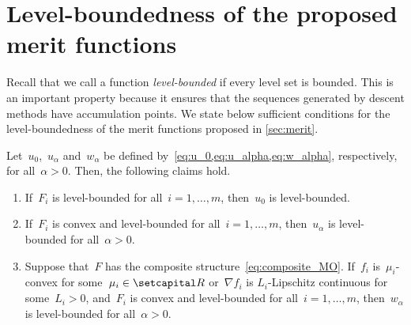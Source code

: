 \documentclass[../main]{subfiles}
\begin{document}
\section{Level-boundedness of the proposed merit functions} \label{sec:merit:lb}
Recall that we call a function \emph{level-bounded} if every level set is bounded.
This is an important property because it ensures that the sequences generated by descent methods have accumulation points.
We state below sufficient conditions for the level-boundedness of the merit functions proposed in \cref{sec:merit}.
\begin{theorem}
    Let~$u_0$,~$u_\alpha$ and~$w_\alpha$ be defined by~\cref{eq:u_0,eq:u_alpha,eq:w_alpha}, respectively, for all~$\alpha > 0$.
    Then, the following claims hold.
    \begin{enumerate}
        \item If~$F_i$ is level-bounded for all~$i = 1, \dots, m$, then~$u_0$ is level-bounded. \label{enum:u_0 level-bounded}
        \item If~$F_i$ is convex and level-bounded for all~$i = 1, \dots, m$, then~$u_\alpha$ is level-bounded for all~$\alpha > 0$. \label{enum:u_alpha level-bounded}
        \item Suppose that~$F$ has the composite structure~\cref{eq:composite_MO}.
            If~$f_i$ is~$\mu_i$-convex for some~$\mu_i \in \setR$ or~$\nabla f_i$ is $L_i$-Lipschitz continuous for some~$L_i > 0$, and~$F_i$ is convex and level-bounded for all~$i = 1, \dots, m$, then~$w_\alpha$ is level-bounded for all~$\alpha > 0$. \label{enum:w level-bounded}
    \end{enumerate}
\end{theorem}
\end{document}
